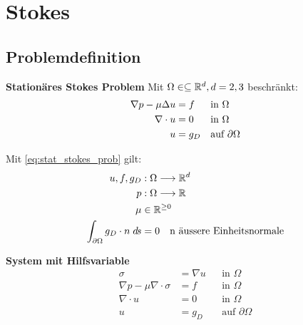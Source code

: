 \chapter{Stokes}
\section{Problemdefinition}

\begin{definition}\textbf{Stationäres Stokes Problem}
	\label{def:stat_stokes_prob}
    Mit $\Omega \in  \subseteq \mathbb{R}^d , d = 2,3$ beschränkt:
    \begin{align}\label{eq:stat_stokes_prob}
        \nabla p - \mu \Delta u &= f & & \text{in } \Omega \notag \\
        \nabla \cdot u &= 0 & & \text{in } \Omega \\
        u &= g_D & & \text{auf } \partial \Omega \notag 
    \end{align}
\end{definition}

\begin{bemerkung}
    Mit \eqref{eq:stat_stokes_prob} gilt:
    \begin{align*}
        u,f,g_D &: \Omega \longrightarrow \mathbb{R}^d \\
        p &: \Omega \longrightarrow \mathbb{R} \\
        \mu &\in \mathbb{R}^{\geq 0} \\
        \int_{\partial \Omega}{g_D \cdot n \;d\hspace{-1.25pt} s} &= 0 \quad\text{n äussere Einheitsnormale}\\
    \end{align*}

\end{bemerkung}

\begin{definition}\textbf{System mit Hilfsvariable}\label{def:stokes_system_hilfsv}
    \begin{subequations}
        \begin{align}\label{def:stokes_system_hilfsv|a}
            \sigma &= \nabla u & & \text{in } \Omega \\
            \label{def:stokes_system_hilfsv|b}
            \nabla p - \mu \nabla \cdot \sigma &= f & & \text{in } \Omega \\
            \label{def:stokes_system_hilfsv|c}
            \nabla \cdot u &= 0 & & \text{in } \Omega \\
            \label{def:stokes_system_hilfsv|d}
            u &= g_D & & \text{auf } \partial \Omega 
        \end{align}
    \end{subequations}
\end{definition}

